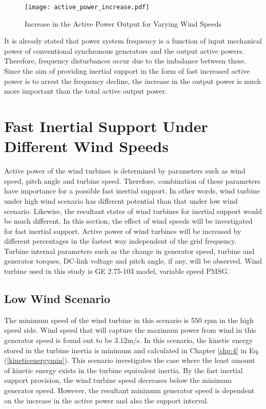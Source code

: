 \begin{figure}[h!]
	\centering
	\texttt{[image: active\_power\_increase.pdf]}
	\caption{Increase in the Active Power Output for Varying Wind Speeds}
	\label{increase_active_power}
\end{figure}
It is already stated that power system frequency is a function of input mechanical power of conventional synchronous generators and the output active powers. Therefore, frequency disturbances occur due to the imbalance between these. Since the aim of providing inertial support in the form of fast increased active power is to arrest the frequency decline, the increase in the output power is much more important than the total active output power. 
\section{Fast Inertial Support Under Different Wind Speeds}
Active power of the wind turbines is determined by parameters such as wind speed, pitch angle and turbine speed. Therefore, combination of these parameters have importance for a possible fast inertial support. In other words, wind turbine under high wind scenario has different potential than that under low wind scenario. Likewise, the resultant states of wind turbines for inertial support would be much different. In this section, the effect of wind speeds will be investigated for fast inertial support. Active power of wind turbines will be increased by different percentages in the fastest way independent of the grid frequency. Turbine internal parameters such as the change in generator speed, turbine and generator torques, DC-link voltage and pitch angle, if any, will be observed. Wind turbine used in this study is GE 2.75-103 model, variable speed PMSG.
\subsection{Low Wind Scenario}
\label{sec:lowwind}
The minimum speed of the wind turbine in this scenario is 550 rpm in the high speed side. Wind speed that will capture the maximum power from wind in this generator speed is found out to be 3.12m/s. In this scenario, the kinetic energy stored in the turbine inertia is minimum and calculated in Chapter \ref{chp:4} in Eq. (\ref{kineticenergymin}). This scenario investigates the case where the least amount of kinetic energy exists in the turbine equivalent inertia. By the fast inertial support provision, the wind turbine speed decreases below the minimum generator speed. However, the resultant minimum generator speed is dependent on the increase in the active power and also the support interval.
